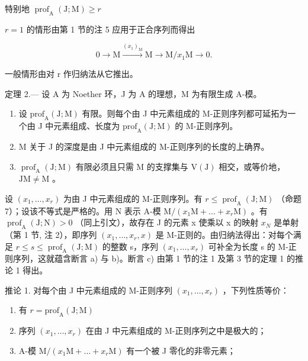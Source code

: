 特别地 \(\operatorname{prof}_{\mathrm{A}}(\mathrm{J};\mathrm{M})\geqslant r\)

\(r=1\) 的情形由第 1 节的注 5 应用于正合序列而得出

\[
0 \rightarrow \mathrm{M} \xrightarrow {(x _ {1}) _ {\mathrm{M}}} \mathrm{M} \longrightarrow \mathrm{M} / x _ {1} \mathrm{M} \rightarrow 0.
\]

一般情形由对 r 作归纳法从它推出。

定理 2.--- 设 A 为 Noether 环，J 为 A 的理想，M 为有限生成 A-模。

\begin{enumerate}
\def\labelenumi{\alph{enumi})}
\item
  设 \(\mathrm{prof}_{\mathrm{A}}(\mathrm{J};\mathrm{M})\) 有限。则每个由 J 中元素组成的 M-正则序列都可延拓为一个由 J 中元素组成、长度为 \(\mathrm{prof}_{\mathrm{A}}(\mathrm{J};\mathrm{M})\) 的 M-正则序列。
\item
  M 关于 J 的深度是由 J 中元素组成的 M-正则序列的长度的上确界。
\item
  \(\operatorname{prof}_{\mathrm{A}}(\mathrm{J};\mathrm{M})\) 有限必须且只需 M 的支撑集与 \(\mathrm{V}(\mathrm{J})\) 相交，或等价地，\(\mathrm{JM} \neq \mathrm{M}\) 。
\end{enumerate}

设 \((x_{1},\ldots,x_{r})\) 为由 J 中元素组成的 M-正则序列。有 \(r\leqslant\operatorname{prof}_{\mathrm{A}}(\mathrm{J};\mathrm{M})\) （命题 7）；设该不等式是严格的。用 N 表示 A-模 \(\mathrm{M}/(x_{1}\mathrm{M}+\ldots+x_{r}\mathrm{M})\) 。有 \(\operatorname{prof}_{\mathrm{A}}(\mathrm{J};\mathrm{N})>0\) （同上引文），故存在 J 的元素 x 使乘以 x 的映射 \(x_{N}\) 是单射（第 1 节, 注 2），即序列 \((x_{1},\ldots,x_{r},x)\) 是 M-正则的。由归纳法得出：对每个满足 \(r\leqslant s\leqslant\operatorname{prof}_{\mathrm{A}}(\mathrm{J};\mathrm{M})\) 的整数 s，序列 \((x_{1},\ldots,x_{r})\) 可补全为长度 s 的 M-正则序列，这就蕴含断言 a) 与 b)。断言 c) 由第 1 节的注 1 及第 3 节的定理 1 的推论 1 得出。

推论 1. 对每个由 J 中元素组成的 M-正则序列 \((x_{1},\ldots ,x_{r})\) ，下列性质等价：

\begin{enumerate}
\def\labelenumi{(\roman{enumi})}
\item
  有 \(r = \mathrm{prof}_{\mathrm{A}}(\mathrm{J};\mathrm{M})\)
\item
  序列 \((x_{1},\ldots,x_{r})\) 在由 J 中元素组成的 M-正则序列之中是极大的；
\item
  A-模 \(\mathrm{M}/(x_{1}\mathrm{M}+\ldots+x_{r}\mathrm{M})\) 有一个被 J 零化的非零元素；
\end{enumerate}

